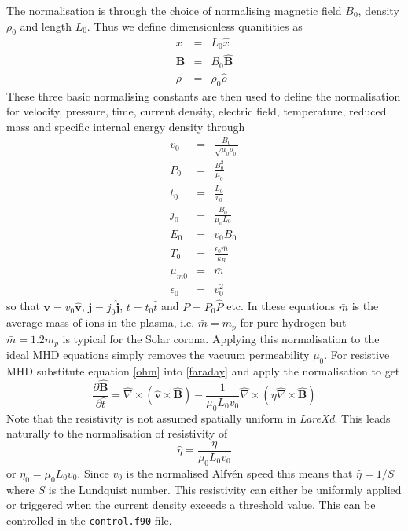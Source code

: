 \documentclass[11pt]{article}
\begin{document}
The normalisation is through the choice of normalising magnetic field $B_0$, density $\rho_0$ and length $L_0$. Thus we define dimensionless quanitities as
\begin{eqnarray*}
x&=&L_0 \hat{x}\\
\mathbf{B}&=&B_0\hat{\mathbf{B}} \\
\rho&=&\rho_0 \hat{\rho}
\end{eqnarray*}
These three basic normalising constants are then used to define the normalisation for velocity, pressure, time, current density, electric field, temperature, reduced mass and specific internal energy density through
\begin{eqnarray*}
v_{0}&=&\frac{B_{0}}{\sqrt{\mu_{0}\rho_{0}}}\\
P_{0}&=&\frac{B^{2}_{0}}{\mu_{0}} \\
t_0&=&\frac{L_0}{v_0}\\
j_{0}&=&\frac{B_{0}}{\mu_{0}L_{0}}\\
E_0&=&v_0 B_0\\
T_0&=&\frac{\epsilon_0 \bar{m}}{k_B}\\
\mu_{m0}&=&\bar{m}\\
\epsilon_0&=&v_0^2
\end{eqnarray*}
so that $\mathbf{v}=v_0\hat{\mathbf{v}}$, $\mathbf{j}=j_0\hat{\mathbf{j}}$, $t=t_0\hat{t}$ and $P=P_0\hat{P}$ etc. In these equations $\bar{m}$ is the average mass of ions in the plasma, i.e. $\bar{m}=m_p$ for pure hydrogen but  $\bar{m}=1.2 m_p$ is typical for the Solar corona. Applying this normalisation to the ideal MHD equations simply removes the vacuum permeability $\mu_0$. For resistive MHD substitute equation \ref{ohm} into \ref{faraday} and apply the normalisation to get
\begin{displaymath}
 \frac{\partial \hat{\mathbf{B}}}{\partial \hat{t}}=\hat{\nabla}\times(\hat{\mathbf{v}}\times\hat{\mathbf{B}})
	-\frac{1}{\mu_0 L_0 v_0}\hat{\nabla}\times(\eta\hat{\nabla}\times\hat{\mathbf{B}}) 
\end{displaymath}
Note that the resistivity is not assumed spatially uniform in {\it LareXd}. This leads naturally to the normalisation of resistivity of 
\begin{displaymath}
 \hat{\eta}=\frac{\eta}{\mu_0 L_0 v_0}
\end{displaymath}
or $\eta_0=\mu_0 L_0 v_0$. Since $v_0$ is the normalised Alfv\'en speed this means that $\hat{\eta}=1/S$ where $S$ is the Lundquist number. This resistivity can either be uniformly applied or triggered when the current density exceeds a threshold value. This can be controlled in the \texttt{control.f90} file.
\end{document}
